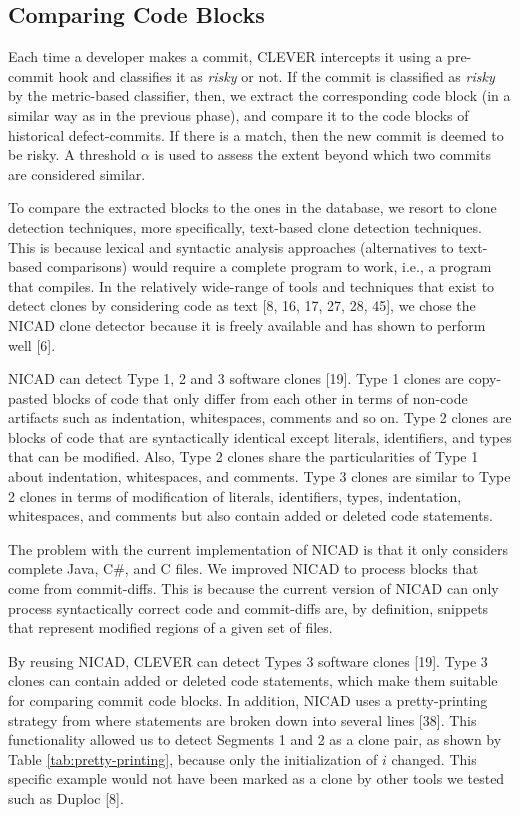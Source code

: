 \documentclass[sigconf]{acmart}
\begin{document}
\subsection{Comparing Code Blocks}\label{sec:online}

Each time a developer makes a commit, CLEVER intercepts it using a
pre-commit hook and classifies it as \emph{risky} or not. If the commit
is classified as \emph{risky} by the metric-based classifier, then, we
extract the corresponding code block (in a similar way as in the
previous phase), and compare it to the code blocks of historical
defect-commits. If there is a match, then the new commit is deemed to be
risky. A threshold \(\alpha\) is used to assess the extent beyond which
two commits are considered similar.

To compare the extracted blocks to the ones in the database, we resort
to clone detection techniques, more specifically, text-based clone
detection techniques. This is because lexical and syntactic analysis
approaches (alternatives to text-based comparisons) would require a
complete program to work, i.e., a program that compiles. In the
relatively wide-range of tools and techniques that exist to detect
clones by considering code as text [8, 16, 17, 27, 28, 45], we chose
the NICAD clone detector because it is freely available and has shown to
perform well [6].

NICAD can detect Type 1, 2 and 3 software clones [19]. Type 1 clones
are copy-pasted blocks of code that only differ from each other in terms
of non-code artifacts such as indentation, whitespaces, comments and so
on. Type 2 clones are blocks of code that are syntactically identical
except literals, identifiers, and types that can be modified. Also, Type
2 clones share the particularities of Type 1 about indentation,
whitespaces, and comments. Type 3 clones are similar to Type 2 clones in
terms of modification of literals, identifiers, types, indentation,
whitespaces, and comments but also contain added or deleted code
statements.

The problem with the current implementation of NICAD is that it only
considers complete Java, C\#, and C files. We improved NICAD to process
blocks that come from commit-diffs. This is because the current version
of NICAD can only process syntactically correct code and commit-diffs
are, by definition, snippets that represent modified regions of a given
set of files.

By reusing NICAD, CLEVER can detect Types 3 software clones [19].
Type 3 clones can contain added or deleted code statements, which make
them suitable for comparing commit code blocks. In addition, NICAD uses
a pretty-printing strategy from where statements are broken down into
several lines [38]. This functionality allowed us to detect Segments
1 and 2 as a clone pair, as shown by Table \ref{tab:pretty-printing},
because only the initialization of \(i\) changed. This specific example
would not have been marked as a clone by other tools we tested such as
Duploc [8].
\end{document}

